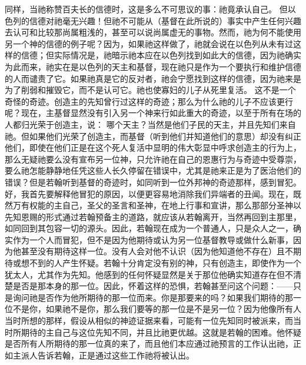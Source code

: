 同样，当祂称赞百夫长的信德时，这是多么不可思议的事：祂竟承认自己。 但以色列的信德对祂毫无兴趣！但祂不可能从（基督在此所说的）事实中产生任何兴趣去认可和比较那尚属粗浅的，甚至可以说尚属虚无的事物。然而，祂为何不能使用另一个神的信德的例子呢？因为，如果祂这样做了，祂就会说在以色列从未有过这样的信德；但实际情况是，祂暗示祂本应在以色列找到如此大的信德，因为祂确实为此而来，祂实在是以色列的天主和基督，现在祂只是作为一个要执行和维护信德的人而谴责了它。如果祂真是它的反对者，祂会宁愿找到这样的信德，因为祂来是为了削弱和摧毁它，而不是认可它。祂也使寡妇的儿子从死里复活。 这不是一个奇怪的奇迹。创造主的先知曾行过这样的奇迹；那么为什么祂的儿子不应该更行呢？现在，主基督显然没有引入另一个神来行如此重大的奇迹，以至于所有在场的人都归光荣于创造主，说： 哪个天主？当然是他们子民的天主，并且先知们来自祂。但如果他们光荣了创造主，而基督（听到他们并知道他们的意思）却没有纠正他们，即使在他们正是在这个死人复活中显明的伟大彰显中呼求创造主的行为上，那么无疑祂要么没有宣布另一位神，只允许祂在自己的恩惠行为与奇迹中受尊崇，要么祂怎能静静地任凭这些人长久停留在错误中，尤其是祂来正是为了医治他们的错误？但是若翰听到基督的奇迹时，如同听到一位外邦神的奇迹那样，感到冒犯。好，我首先要解释他冒犯的原因，以便更容易地消除我们异端者的丑闻。现在，既然万有权能的主自己，圣父的圣言和圣神，在地上行事和宣讲，那么那部分圣神以先知恩赐的形式通过若翰预备主的道路，就应该从若翰离开，当然再回到主那里，如同回到其包容一切的源头。因此，若翰现在成为一个普通人，只是众人之一，确实作为一个人而冒犯，但不是因为他期待或认为另一位基督教导或做什么新事，因为他甚至没有期待这样一位。没有人会对他不认识（因为他知道他不存在）且不期待或想不到的人产生怀疑。若翰十分肯定没有别的神，只有创造主，即使作为一个犹太人，尤其作为先知。他感到的任何怀疑显然是关于那位他确实知道存在但不清楚是否是那本身的那一位。因此，怀着这样的恐惧，若翰甚至问这个问题：——只是询问祂是否作为他所期待的那一位而来。你是那要来的吗？如果我们期待的那一位不是你，如果祂不是你，那么我们要等的那一位是不是另一位？因为他像所有人当时所想的那样，假设从相似的神迹证据来看，可能有一位先知同时被派来，而当时所期待的主自己与这位先知不同，并且比祂更优越。这就是若翰的困难。他怀疑是否所有人所期待的那一位真的来了，而且他们本应通过祂预言的工作认出祂，正如主派人告诉若翰，正是通过这些工作祂将被认出。 